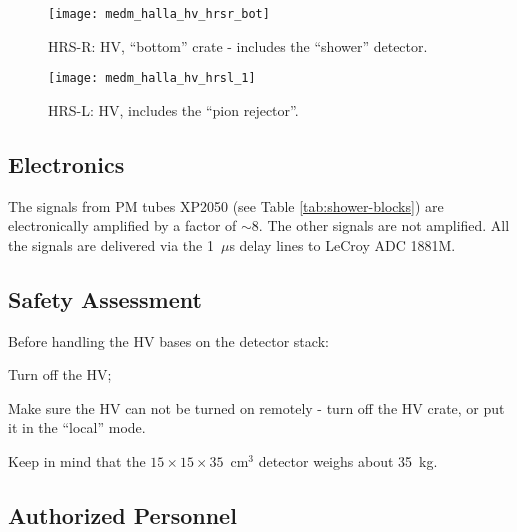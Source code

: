 {\begin{figure}
\begin{center}
  \texttt{[image: medm\_halla\_hv\_hrsr\_bot]}
\end{center}
\caption[Detectors: Shower HRS-R HV top]{
  HRS-R: HV, ``bottom'' crate - includes the ``shower'' detector.} 
\label{fig:hrs-det-hv-hrsr-bot}
\end{figure}

\begin{figure}
\begin{center}
  \texttt{[image: medm\_halla\_hv\_hrsl\_1]}
\end{center}
\caption[Detectors: Shower HRS-L HV]{
  HRS-L: HV, includes the ``pion rejector''.} 
\label{fig:hrs-det-hv-hrsl}
\end{figure}

\subsection{Electronics}

The signals from PM tubes XP2050 (see Table \ref{tab:shower-blocks})
are electronically amplified by a factor of $\sim$8. The other signals
are not amplified. All the signals
are delivered via the 1~$\mu$s delay lines to LeCroy ADC 1881M.

} %

\begin{safetyen}{10}{10}
\section{Safety Assessment}
\end{safetyen}

  
  Before handling the HV bases on the detector stack:
 \begin{list}{.~}{\setlength{\itemsep}{-0.15cm}}
    \item Turn off the HV;
    \item Make sure the HV can not be turned on remotely - turn off the HV crate,
          or put it in the ``local'' mode.
 \end{list}


 Keep in mind that the $15\times{}15\times{}35$~cm$^3$ detector weighs 
 about 35~kg.

\begin{safetyen}{0}{0}
\section[Authorized  Personnel]{Authorized  Personnel}
\end{safetyen}

